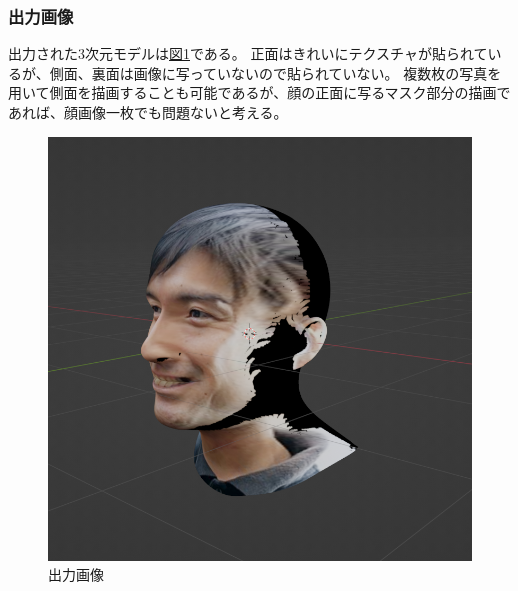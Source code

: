 \documentclass[]{jarticle}          %
\begin{document}
\subsubsection{出力画像}
出力された3次元モデルは\hyperref[two]{図\ref{two}}である。
正面はきれいにテクスチャが貼られているが、側面、裏面は画像に写っていないので貼られていない。
複数枚の写真を用いて側面を描画することも可能であるが、顔の正面に写るマスク部分の描画であれば、顔画像一枚でも問題ないと考える。
\begin{figure}[!ht]
  \begin{center}
    \includegraphics[scale=0.25]{figures/man3d.png}
    \caption{出力画像}
    \label{two}
  \end{center}
\end{figure}
\end{document}
